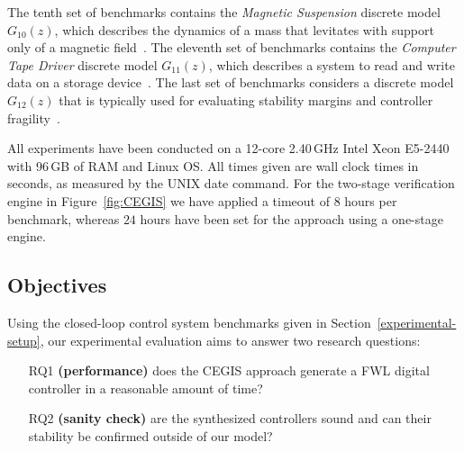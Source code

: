 \documentclass[final]{sig-alternate-05-2015}
\begin{document}
%
The tenth set of benchmarks contains the \textit{Magnetic Suspension} discrete model $G_{10}(z)$, which describes the dynamics of a mass that levitates with support only of a magnetic field~\cite{Franklin15}. 
%
%
%
The eleventh set of benchmarks contains the \textit{Computer Tape Driver} discrete model $G_{11}(z)$, which 
describes a system to read and write data on a storage device~\cite{Franklin15}.
%
%
The last set of benchmarks considers a discrete model $G_{12}(z)$ 
that is typically used for evaluating stability
margins and controller fragility~\cite{bhattacharyya97, keel_Bhattacharyya_examples}.

All experiments have been conducted on a 12-core 2.40\,GHz Intel Xeon E5-2440
with 96\,GB of RAM and Linux OS.  All times given are wall clock times in
seconds, as measured by the UNIX date command.  For the two-stage verification 
engine in Figure~\ref{fig:CEGIS} we have applied a timeout of $8$ hours per benchmark, 
whereas $24$ hours have been set for the approach using a one-stage engine. 

\subsection{Objectives}
\label{experimental-objectives}

Using the closed-loop control system benchmarks given in
Section~\ref{experimental-setup}, our experimental evaluation aims to answer
two research questions:
%
\begin{enumerate}

\item[RQ1] \textbf{(performance)} does the CEGIS approach generate a 
FWL digital controller in a reasonable amount of time?

\item[RQ2] \textbf{(sanity check)} are the synthesized controllers sound
and can their stability be confirmed outside of our model?

\end{enumerate}
\end{document}

